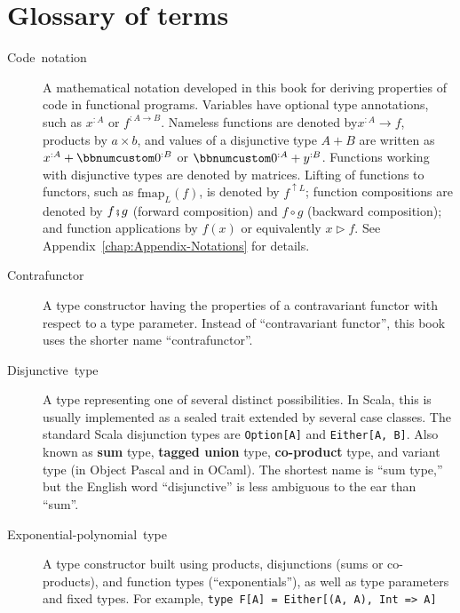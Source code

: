 \chapter{Glossary of terms\label{chap:Appendix-Glossary-of-terms}}
\begin{description}
\item [{Code~notation}] A mathematical notation
developed in this book for deriving properties of code in functional
programs. Variables have optional type annotations, such as $x^{:A}$
or $f^{:A\rightarrow B}$. Nameless functions are denoted by$x^{:A}\rightarrow f$,
products by $a\times b$, and values of a disjunctive type $A+B$
are written as $x^{:A}+\bbnum 0^{:B}$ or $\bbnum 0^{:A}+y^{:B}$.
Functions working with disjunctive types are denoted by matrices.
Lifting of functions to functors, such as $\text{fmap}_{L}(f)$, is
denoted by $f^{\uparrow L}$; function compositions are denoted by
$f\bef g$ (forward composition) and $f\circ g$ (backward composition);
and function applications by $f(x)$ or equivalently $x\triangleright f$.
See Appendix~\ref{chap:Appendix-Notations} for details.
\item [{Contrafunctor}] A type constructor having
the properties of a contravariant functor with
respect to a type parameter. Instead of \textsf{``}contravariant functor\textsf{''},
this book uses the shorter name \textsf{``}contrafunctor\textsf{''}.
\item [{Disjunctive~type}] A type representing
one of several distinct possibilities. In Scala, this is usually implemented
as a sealed trait extended by several case classes. The standard Scala
disjunction types are \lstinline!Option[A]! and \lstinline!Either[A, B]!.
Also known as \textbf{sum
}type, \textbf{tagged union}
type, \textbf{co-product}
type, and variant type (in Object Pascal and in OCaml). The shortest
name is \textsf{``}sum type,\textsf{''} but the English word \textsf{``}disjunctive\textsf{''} is
less ambiguous to the ear than \textsf{``}sum\textsf{''}.
\item [{Exponential-polynomial~type}] A
type constructor built using products, disjunctions (sums or co-products),
and function types (\textsf{``}exponentials\textsf{''}), as well as type parameters
and fixed types. For example,  \lstinline!type F[A] = Either[(A, A), Int => A]!

\end{description}

